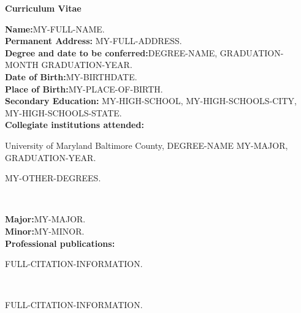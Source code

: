 \begin{titlepage}

\begin{center}
\vspace{0.1in}
\large{\bf Curriculum Vitae}
\bigskip \bigskip
\end{center}

\begin{flushleft}
  {\bf Name:}{\hspace{3mm}}MY-FULL-NAME.\\
	{\bf Permanent Address:}{\hspace{3mm}} MY-FULL-ADDRESS. \\
	{\bf Degree and date to be conferred:}{\hspace{3mm}}DEGREE-NAME, GRADUATION-MONTH GRADUATION-YEAR. \\
	{\bf Date of Birth:}{\hspace{3mm}}MY-BIRTHDATE. \\
	{\bf Place of Birth:}{\hspace{3mm}}MY-PLACE-OF-BIRTH. \\
	{\bf Secondary Education:}{\hspace{3mm}} MY-HIGH-SCHOOL, MY-HIGH-SCHOOLS-CITY, MY-HIGH-SCHOOLS-STATE.\\
	{\bf Collegiate institutions attended:}\\
	\begin{singlespace} 
	{\hspace{0.4in}}University of Maryland Baltimore County, DEGREE-NAME MY-MAJOR, GRADUATION-YEAR. \\
	{\hspace{0.4in}}\parbox[t]{5.5in}{MY-OTHER-DEGREES.} \\
	\end{singlespace} 
	\vspace{8pt}
	{\bf Major:}{\hspace{3mm}}MY-MAJOR.\\
	{\bf Minor:}{\hspace{3mm}}MY-MINOR.\\
	{\bf Professional publications:}\\
	\begin{singlespace} 
  {\hspace{0.4in}} \parbox[t]{5.5in}{FULL-CITATION-INFORMATION.}\\
  {\vspace{5pt}}
  {\hspace{0.4in}} \parbox[t]{5.5in}{FULL-CITATION-INFORMATION.}\\

\end{singlespace}
\end{flushleft}
\end{titlepage}

